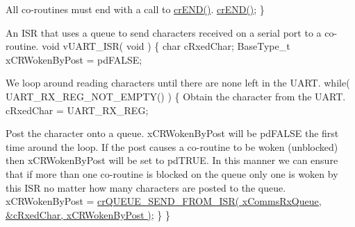 \begin{DoxyPre}All co-routines must end with a call to \hyperlink{croutine_8h_ae6038cc976689b50000475ebfc4e2f23}{crEND()}.
     \hyperlink{croutine_8h_ae6038cc976689b50000475ebfc4e2f23}{crEND()};
 \}\end{DoxyPre}



\begin{DoxyPre}An ISR that uses a queue to send characters received on a serial port to
a co-routine.
 void vUART\_ISR( void )
 \{
 char cRxedChar;
 BaseType\_t xCRWokenByPost = pdFALSE;\end{DoxyPre}



\begin{DoxyPre}We loop around reading characters until there are none left in the UART.
     while( UART\_RX\_REG\_NOT\_EMPTY() )
     \{
Obtain the character from the UART.
         cRxedChar = UART\_RX\_REG;\end{DoxyPre}



\begin{DoxyPre}Post the character onto a queue.  xCRWokenByPost will be pdFALSE
the first time around the loop.  If the post causes a co-routine
to be woken (unblocked) then xCRWokenByPost will be set to pdTRUE.
In this manner we can ensure that if more than one co-routine is
blocked on the queue only one is woken by this ISR no matter how
many characters are posted to the queue.
         xCRWokenByPost = \hyperlink{croutine_8h_ac8eb0a81c5cf69de7e4edd73ce44a3be}{crQUEUE\_SEND\_FROM\_ISR( xCommsRxQueue, &cRxedChar, xCRWokenByPost )};
     \}
 \}\end{DoxyPre}
 